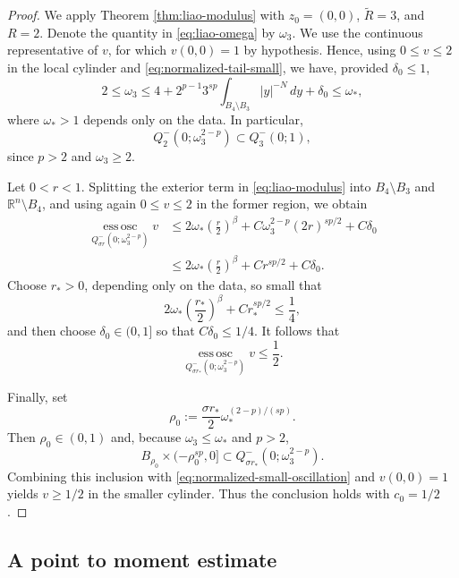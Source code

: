\documentclass[10pt]{amsart}
\theoremstyle{plain}
\theoremstyle{definition}
\theoremstyle{remark}
\numberwithin{equation}{section}
\newcommand{\R}{\mathbb R}
\begin{document}
\begin{proof}
We apply Theorem \ref{thm:liao-modulus} with $z_0=(0,0)$,
$\widetilde R=3$, and $R=2$. Denote the quantity in
\eqref{eq:liao-omega} by $\omega_3$. We use the continuous
representative of $v$, for which $v(0,0)=1$ by hypothesis. Hence,
using $0\le v\le2$ in the local cylinder and
\eqref{eq:normalized-tail-small}, we have, provided $\delta_0\le1$,
\begin{equation}\label{eq:omega3-bounds}
2
\le
\omega_3
\le
4
+
2^{p-1}3^{sp}
\int_{B_4\setminus B_3}|y|^{-N}\,dy
+
\delta_0
\le
\omega_*,
\end{equation}
where $\omega_*>1$ depends only on the data. In particular,
\[
Q^-_2(0;\omega_3^{2-p})
\subset Q^-_3(0;1),
\]
since $p>2$ and $\omega_3\ge2$.

Let $0<r<1$. Splitting the exterior term in
\eqref{eq:liao-modulus} into $B_4\setminus B_3$ and
$\R^n\setminus B_4$, and using again $0\le v\le2$ in the former region,
we obtain
\begin{equation}\label{eq:normalized-oscillation-bound}
\begin{split}
\operatorname*{ess\,osc}_
{Q^-_{\sigma r}(0;\omega_3^{2-p})}v
&\le
2\omega_*\left(\frac r2\right)^\beta
+C\omega_3^{2-p}(2r)^{sp/2}
+C\delta_0
\\
&\le
2\omega_*\left(\frac r2\right)^\beta
+Cr^{sp/2}
+C\delta_0.
\end{split}
\end{equation}
Choose $r_*>0$, depending only
on the data, so small that
\[
2\omega_*\left(\frac {r_*}2\right)^\beta
+Cr_*^{sp/2}
\le\frac14,
\]
and then choose $\delta_0\in(0,1]$ so that $C\delta_0\le1/4$.
It follows that
\begin{equation}\label{eq:normalized-small-oscillation}
\operatorname*{ess\,osc}_
{Q^-_{\sigma r_*}(0;\omega_3^{2-p})}v
\le\frac12.
\end{equation}

Finally, set
\[
\rho_0
:=
\frac{\sigma r_*}{2}
\omega_*^{(2-p)/(sp)}.
\]
Then $\rho_0\in(0,1)$ and, because $\omega_3\le\omega_*$ and $p>2$,
\[
B_{\rho_0}\times(-\rho_0^{sp},0]
\subset
Q^-_{\sigma r_*}(0;\omega_3^{2-p}).
\]
Combining this inclusion with \eqref{eq:normalized-small-oscillation} and
$v(0,0)=1$ yields $v\ge1/2$ in the smaller cylinder. Thus the conclusion
holds with $c_0=1/2$.
\end{proof}

\subsection{A point to moment estimate}
\end{document}
